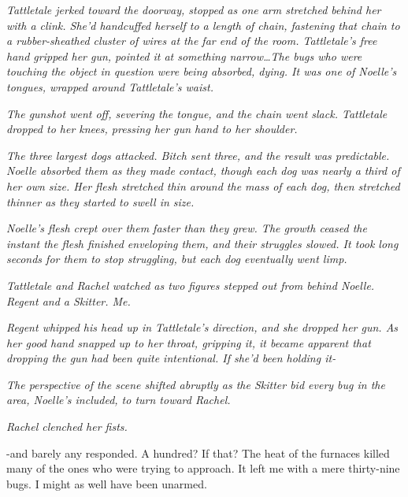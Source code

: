 \sectionbreak



\emph{Tattletale jerked toward the doorway, stopped as one arm stretched behind her with a clink.  She'd handcuffed herself to a length of chain, fastening that chain to a rubber-sheathed cluster of wires at the far end of the room.  Tattletale's free hand gripped her gun, pointed it at something narrow\ldots The bugs who were touching the object in question were being absorbed, dying.  It was one of Noelle's tongues, wrapped around Tattletale's waist.}



\emph{The gunshot went off, severing the tongue, and the chain went slack.  Tattletale dropped to her knees, pressing her gun hand to her shoulder.}



\emph{The three largest dogs attacked.  Bitch sent three, and the result was predictable.  Noelle absorbed them as they made contact, though each dog was nearly a third of her own size.  Her flesh stretched thin around the mass of each dog, then stretched thinner as they started to swell in size.}



\emph{Noelle's flesh crept over them faster than they grew.  The growth ceased the instant the flesh finished enveloping them, and their struggles slowed.  It took long seconds for them to stop struggling, but each dog eventually went limp.}



\emph{Tattletale and Rachel watched as two figures stepped out from behind Noelle.  Regent and a Skitter.  Me.}



\emph{Regent whipped his head up in Tattletale's direction, and she dropped her gun.  As her good hand snapped up to her throat, gripping it, it became apparent that dropping the gun had been quite intentional.  If she'd been holding it-}



\emph{The perspective of the scene shifted abruptly as the Skitter bid every bug in the area, Noelle's included, to turn toward Rachel.}



\emph{Rachel clenched her fists.}



\sectionbreak



-and barely any responded.  A hundred?  If that?  The heat of the furnaces killed many of the ones who were trying to approach.  It left me with a mere thirty-nine bugs.  I might as well have been unarmed.



